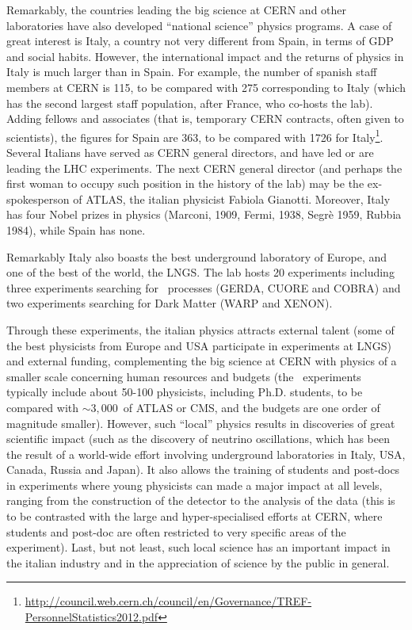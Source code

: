 Remarkably, the countries leading the big science at CERN and other laboratories have also developed ``national science'' physics programs. A case of great interest is Italy, a country not very different from Spain, in terms of GDP and social habits. However, the international impact and the returns of physics in Italy is much larger than in Spain. For example, the number of spanish staff members at CERN is 115, to be compared with 275 corresponding to Italy (which has the second largest staff population, after France, who co-hosts the lab). Adding fellows and associates (that is, temporary CERN contracts, often given to scientists), the figures for Spain are 363, to be compared with 1726 for Italy\footnote{\href{http://council.web.cern.ch/council/en/Governance/TREF-PersonnelStatistics2012.pdf}{http://council.web.cern.ch/council/en/Governance/TREF-PersonnelStatistics2012.pdf}}. Several Italians have served as CERN general directors, and have led or are leading the LHC experiments. The next CERN general director (and perhaps the first woman to occupy such position in the history of the lab) may be the ex-spokesperson of ATLAS, the italian physicist Fabiola Gianotti. Moreover, Italy has four Nobel prizes in physics (Marconi, 1909, Fermi, 1938, Segrè 1959, Rubbia 1984), while Spain has none. 

Remarkably Italy also boasts the best underground laboratory of Europe, and one of the best of the world, the LNGS. The lab hosts 20 experiments including three experiments searching for \bbonu\ processes (GERDA, CUORE and COBRA) and two experiments searching for Dark Matter (WARP and XENON). 

Through these experiments, the italian physics attracts external talent (some of the best physicists from Europe and USA participate in experiments at LNGS) and external funding, complementing the big science at CERN with physics of a smaller scale concerning human resources and budgets (the \bbonu\ experiments typically include about 50-100 physicists, including Ph.D. students, to be compared with $\sim 3,000$~of ATLAS or CMS, and the budgets are one order of magnitude smaller). However, such ``local'' physics results in discoveries of great scientific impact (such as the discovery of neutrino oscillations, which has been the result of a world-wide effort involving underground laboratories in Italy, USA, Canada, Russia and Japan). It also allows the training of students and post-docs in experiments where young physicists can made a major impact at all levels, ranging from the construction of the detector to the analysis of the data (this is to be contrasted with the large and hyper-specialised efforts at CERN, where students and post-doc are often restricted to very specific areas of the experiment). Last, but not least, such local science has an important impact in the italian industry and in the appreciation of science by the public in general. 

